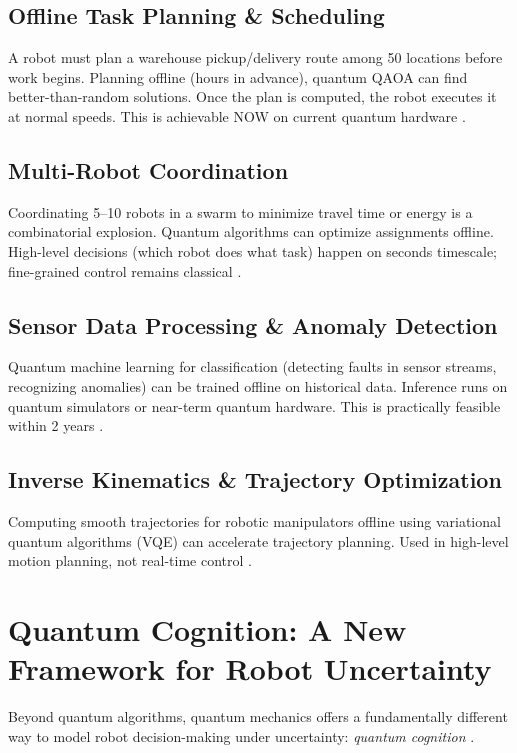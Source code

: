 \documentclass[journal]{IEEEtran}
\begin{document}
\subsection{Offline Task Planning \& Scheduling}

A robot must plan a warehouse pickup/delivery route among 50 locations before work begins. Planning offline (hours in advance), quantum QAOA can find better-than-random solutions. Once the plan is computed, the robot executes it at normal speeds. This is achievable NOW on current quantum hardware \cite{b15, b18, b37}.

\subsection{Multi-Robot Coordination}

Coordinating 5--10 robots in a swarm to minimize travel time or energy is a combinatorial explosion. Quantum algorithms can optimize assignments offline. High-level decisions (which robot does what task) happen on seconds timescale; fine-grained control remains classical \cite{b38, b39, b40}.

\subsection{Sensor Data Processing \& Anomaly Detection}

Quantum machine learning for classification (detecting faults in sensor streams, recognizing anomalies) can be trained offline on historical data. Inference runs on quantum simulators or near-term quantum hardware. This is practically feasible within 2 years \cite{b41, b42, b43}.

\subsection{Inverse Kinematics \& Trajectory Optimization}

Computing smooth trajectories for robotic manipulators offline using variational quantum algorithms (VQE) can accelerate trajectory planning. Used in high-level motion planning, not real-time control \cite{b44, b45, b34}.

\section{Quantum Cognition: A New Framework for Robot Uncertainty}

Beyond quantum algorithms, quantum mechanics offers a fundamentally different way to model robot decision-making under uncertainty: \textit{quantum cognition} \cite{b46, b47, b48}.
\end{document}
